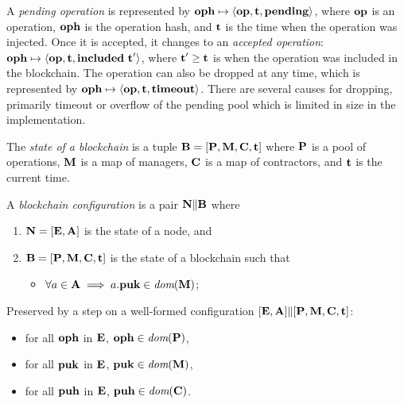 \documentclass[a4paper]{llncs}
\begin{document}
A \emph{pending operation} is represented by
$\textbf{oph} \mapsto \langle  \textbf{op}, \textbf{t}, \textbf{pending}\rangle $,
where $\textbf{op}$ is an operation, $\textbf{oph}$ is the operation hash,
and $\textbf{t}$ is the time when the operation was injected.
Once it is accepted, it changes to an \emph{accepted operation}:
$\textbf{oph} \mapsto \langle  \textbf{op}, \textbf{t}, \textbf{included}\ \textbf{t}'\rangle $, where
$\textbf{t}' \ge \textbf{t}$ is  when the operation was included in the
blockchain.  The operation can also be dropped at any time, which is
represented by
$\textbf{oph} \mapsto \langle  \textbf{op}, \textbf{t}, \textbf{timeout}\rangle $. There are several
causes for dropping, primarily timeout or overflow of the pending
pool which is limited in size in the implementation.




\begin{definition}%
  The \emph{state of a blockchain} is a tuple
  $\textbf{B} = [\textbf{P}, \textbf{M}, \textbf{C}, \textbf{t}]$ where
  $\textbf{P}$ is a pool of operations, $\textbf{M}$ is a map of managers,
  $\textbf{C}$ is a map of contractors, and $\textbf{t}$ is the current
  time. 
\end{definition}
\begin{definition}%
A \emph{blockchain configuration} is a pair
$ \textbf{N} \| \textbf{B}$ where
\begin{enumerate}
\item $\textbf{N} = [\textbf{E}, \textbf{A}]$ is the state of a node, and
\item $\textbf{B} = [\textbf{P}, \textbf{M}, \textbf{C},
  \textbf{t}]$ is the state of a blockchain  
  such that
  \begin{itemize}
  \item
    $\forall a \in \textbf{A} \implies a.\textbf{puk} \in \textit{dom}( \textbf{M})$;
  \end{itemize}
\end{enumerate}
\end{definition}
\begin{definition}
  Preserved by a step on a well-formed configuration $ [\textbf{E}, \textbf{A}] \|
  [\textbf{P}, \textbf{M}, \textbf{C}, \textbf{t}]$:
  \begin{itemize}
  \item for all $\textbf{oph}$ in $\textbf{E}$, $\textbf{oph} \in \textit{dom} (\textbf{P})$,
  \item for all $\textbf{puk}$ in $\textbf{E}$, $\textbf{puk} \in \textit{dom} (\textbf{M})$,
  \item for all $\textbf{puh}$ in $\textbf{E}$, $\textbf{puh} \in \textit{dom} (\textbf{C})$.
  \end{itemize}
\end{definition}
\end{document}
